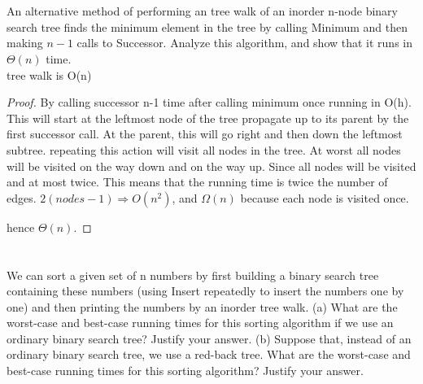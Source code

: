 \documentclass[12pt]{article}
\begin{document}
\maketitle
{}

\section{}
 An alternative method of performing an tree walk of an inorder n-node binary search tree finds the minimum element in the tree by calling Minimum and then making  $n-1$ calls to Successor. Analyze this algorithm, and show that it runs in$ \Theta(n)$ time.\\
 tree walk is O(n)
 
 	\begin{proof}
 	
 	By calling successor n-1 time after calling minimum once running in O(h). This will start at the leftmost node of the tree propagate up to its parent by the first successor call. At the parent, this will go right and then down the leftmost subtree. repeating this action will visit all nodes in the tree. At worst all nodes will be visited on the way down and on the way up. Since all nodes will be visited and at most twice. This means that the running time is twice the number of edges. $2(nodes -1)\Rightarrow O(n^2)$, and $\Omega(n)$ because each node is visited once. 
 	
 	hence $\Theta(n)$.
 	\end{proof}
	
	\pagebreak 
 
 	\section{}
 We can sort a given set of n numbers by first building a binary search tree containing these
numbers (using Insert repeatedly to insert the numbers one by one) and then printing the
numbers by an inorder tree walk.
(a) What are the worst-case and best-case running times for this sorting algorithm if we
use an ordinary binary search tree? Justify your answer.
(b) Suppose that, instead of an ordinary binary search tree, we use a red-back tree. What
are the worst-case and best-case running times for this sorting algorithm? Justify your
answer.\\
\end{document}
